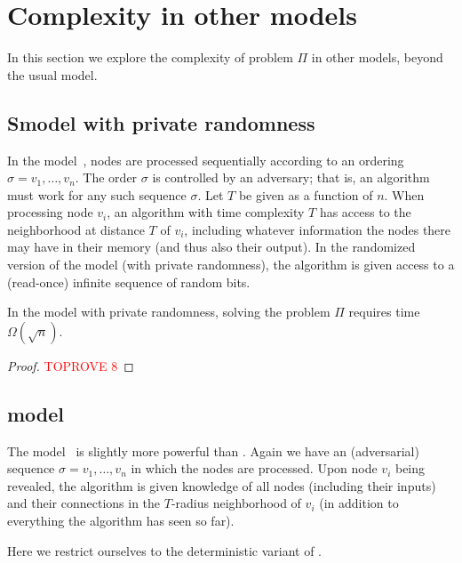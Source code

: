 \documentclass[11pt]{article}
\begin{document}
\section{Complexity in other models}
\label{sec:other-models}

In this section we explore the complexity of problem $\Pi$ in other models, beyond the usual \local model.

\subsection{S\local model with private randomness}\label{sec:slocal}

In the \slocal model~\cite{ghaffari17_complexity_stoc}, nodes are processed
sequentially according to an ordering $\sigma = v_1,\dots,v_n$. 
The order $\sigma$ is controlled by an adversary; that is, an \slocal algorithm
must work for any such sequence $\sigma$.
Let $T$ be given as a function of $n$.
When processing node $v_i$, an algorithm with time complexity $T$ has access to
the neighborhood at distance $T$ of $v_i$, including whatever information the
nodes there may have in their memory (and thus also their output).
In the randomized version of the model (with private randomness), the algorithm
is given access to a (read-once) infinite sequence of random bits.

\begin{theorem}\label{thm:lb-slocal}
	In the \slocal model with private randomness, solving the problem $\Pi$
	requires time $\Omega(\sqrt{n})$.
\end{theorem}
\begin{proof}\textcolor{red}{TOPROVE 8}\end{proof}


\subsection{\Detolcl model}\label{sec:detolcl}

The \onlinelocal model~\cite{akbari23_locality_icalp} is slightly more
powerful than \slocal. Again we have an (adversarial) sequence $\sigma =
v_1,\dots,v_n$ in which the nodes are processed. Upon node $v_i$ being revealed,
the algorithm is given knowledge of all nodes (including their inputs) and their
connections in the $T$-radius neighborhood of $v_i$ (in addition to everything
the algorithm has seen so far).

Here we restrict ourselves to the deterministic variant of \onlinelocal.
\end{document}
